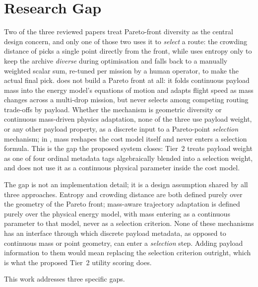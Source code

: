 \documentclass{ssnreview}
\begin{document}
\section{Research Gap}

Two of the three reviewed papers treat Pareto-front diversity as the central design
concern, and only one of those two uses it to \emph{select} a route: the crowding
distance of \cite{r3} picks a single point directly from the front, while \cite{r1} uses
entropy only to keep the archive \emph{diverse} during optimisation and falls back to a
manually weighted scalar sum, re-tuned per mission by a human operator, to make the
actual final pick. \cite{r10} does not build a Pareto front at all: it folds continuous
payload mass into the energy model's equations of motion and adapts flight speed as mass
changes across a multi-drop mission, but never selects among competing routing
trade-offs by payload. Whether the mechanism is geometric diversity or continuous
mass-driven physics adaptation, none of the three use payload weight, or any other
payload property, as a discrete input to a Pareto-point \emph{selection} mechanism; in
\cite{r10}, mass reshapes the cost model itself and never enters a selection formula.
This is the gap the proposed system closes: Tier~2 treats payload weight as one of four
ordinal metadata tags algebraically blended into a selection weight, and does not use it
as a continuous physical parameter inside the cost model.

The gap is not an implementation detail; it is a design assumption shared by all three
approaches. Entropy and crowding distance are both defined purely over the
geometry of the Pareto front; mass-aware trajectory adaptation is defined purely over the
physical energy model, with mass entering as a continuous parameter to that model, never
as a selection criterion. None of these mechanisms has an interface through which
discrete payload metadata, as opposed to continuous mass or point geometry, can enter a
\emph{selection} step. Adding payload information to them would mean replacing the
selection criterion outright, which is what the proposed Tier~2 utility scoring does.

This work addresses three specific gaps.
\end{document}
